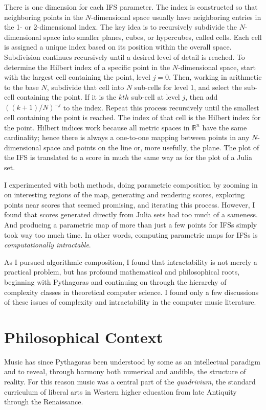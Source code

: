 \documentclass[]{interact}
\theoremstyle{plain}%
\theoremstyle{definition}
\theoremstyle{remark}
\begin{document}
There is one dimension for each IFS parameter. The index is constructed so that neighboring points in the $N$-dimensional space usually have neighboring entries in the 1- or 2-dimensional index. The key idea is to recursively subdivide the $N$-dimensional space into smaller planes, cubes, or hypercubes, called cells. Each cell is assigned a unique index based on its position within the overall space. Subdivision continues recursively until a desired level of detail is reached. To determine the Hilbert index of a specific point in the $N$-dimensional space, start with the largest cell containing the point, level $j = 0$. Then, working in arithmetic to the base $N$, subdivide that cell into $N$ sub-cells for level 1, and select the sub-cell containing the point. If it is the $kth$ sub-cell at level $j$, then add $((k + 1)/N)^{-j}$ to the index. Repeat this process recursively until the smallest cell containing the point is reached. The index of that cell is  the Hilbert index for the point. Hilbert indices work because all metric spaces in $\mathbb{R}^n$ have the same cardinality; hence there is always a one-to-one mapping between points in any $N$-dimensional space and points on the line or, more usefully, the plane. The plot of the IFS is translated to a score in much the same way as for the plot of a Julia set.

I experimented with both methods, doing parametric composition by zooming in on interesting regions of the map, generating and rendering scores, exploring points near scores that seemed promising, and iterating this process. However, I found that scores generated directly from Julia sets had too much of a sameness. And producing a parametric map of more than just a few points for IFSs simply took way too much time. In other words, computing parametric maps for IFSs is \emph{computationally intractable}. 

As I pursued algorithmic composition, I found that intractability is not merely a practical problem, but has profound mathematical and philosophical roots, beginning with Pythagoras and continuing on through the hierarchy of complexity classes in theoretical computer science. I found only a few discussions of these issues of complexity and intractability in the computer music literature.

\section{Philosophical Context}

Music has since Pythagoras \citep{sep-pythagoras, huffman2014history} been understood by some as an intellectual paradigm and to reveal, through harmony both numerical and audible, the structure of reality. For this reason music was a central part of the \emph{quadrivium}, the standard curriculum of liberal arts in Western higher education from late Antiquity through the Renaissance.
\end{document}
